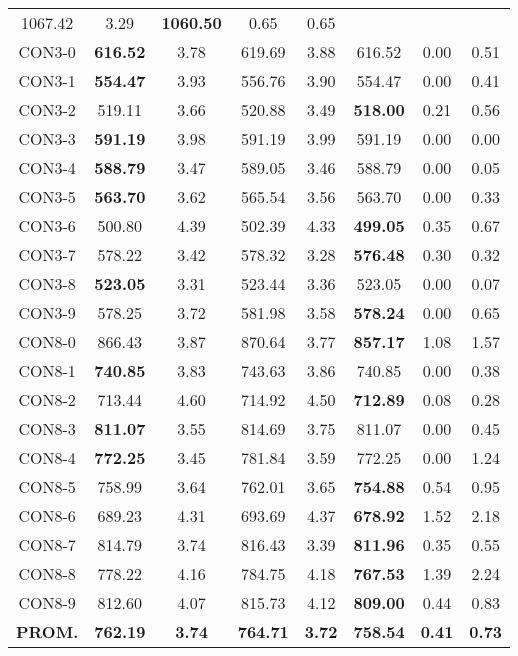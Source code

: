 \begin{table}[h]
\begin{tabular}{c c c c c c c c}
1067.42 & 3.29 & \bf{1060.50} & 
0.65 & 0.65\\CON3-0 & \bf{616.52} & 3.78 & 
619.69 & 3.88 & 616.52 & 0.00
 & 0.51\\CON3-1 & \bf{554.47} & 3.93 & 
556.76 & 3.90 & 554.47 & 0.00
 & 0.41\\CON3-2 & 519.11 & 3.66 & 
520.88 & 3.49 & \bf{518.00} & 
0.21 & 0.56\\CON3-3 & \bf{591.19} & 3.98 & 
591.19 & 3.99 & 591.19 & 0.00
 & 0.00\\
CON3-4 & \bf{588.79} & 3.47 & 
589.05 & 3.46 & 588.79 & 0.00
 & 0.05\\CON3-5 & \bf{563.70} & 3.62 & 
565.54 & 3.56 & 563.70 & 0.00
 & 0.33\\CON3-6 & 500.80 & 4.39 & 
502.39 & 4.33 & \bf{499.05} & 
0.35 & 0.67\\CON3-7 & 578.22 & 3.42 & 
578.32 & 3.28 & \bf{576.48} & 
0.30 & 0.32\\CON3-8 & \bf{523.05} & 3.31 & 
523.44 & 3.36 & 523.05 & 0.00
 & 0.07\\CON3-9 & 578.25 & 3.72 & 
581.98 & 3.58 & \bf{578.24} & 
0.00 & 0.65\\CON8-0 & 866.43 & 3.87 & 
870.64 & 3.77 & \bf{857.17} & 
1.08 & 1.57\\CON8-1 & \bf{740.85} & 3.83 & 
743.63 & 3.86 & 740.85 & 0.00
 & 0.38\\CON8-2 & 713.44 & 4.60 & 
714.92 & 4.50 & \bf{712.89} & 
0.08 & 0.28\\CON8-3 & \bf{811.07} & 3.55 & 
814.69 & 3.75 & 811.07 & 0.00
 & 0.45\\CON8-4 & \bf{772.25} & 3.45 & 
781.84 & 3.59 & 772.25 & 0.00
 & 1.24\\CON8-5 & 758.99 & 3.64 & 
762.01 & 3.65 & \bf{754.88} & 
0.54 & 0.95\\CON8-6 & 689.23 & 4.31 & 
693.69 & 4.37 & \bf{678.92} & 
1.52 & 2.18\\CON8-7 & 814.79 & 3.74 & 
816.43 & 3.39 & \bf{811.96} & 
0.35 & 0.55\\CON8-8 & 778.22 & 4.16 & 
784.75 & 4.18 & \bf{767.53} & 
1.39 & 2.24\\CON8-9 & 812.60 & 4.07 & 
815.73 & 4.12 & \bf{809.00} & 
0.44 & 0.83\\\bf{PROM.} & 
\bf{762.19} & \bf{3.74} & \bf{764.71} & \bf{3.72} & \bf{758.54} & \bf{0.41} & \bf{0.73}\\[1ex]\hline
\end{tabular}
\label{table:nonlin}
\end{table}
